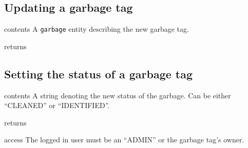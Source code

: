 \subsection{Updating a garbage tag}

\begin{apidata}{contents}
  A \texttt{garbage} entity describing the new garbage tag.
\end{apidata}
\begin{apidata}{returns}
  \begin{datalist}
  \end{datalist}
\end{apidata}


% 
% 


\subsection{Setting the status of a garbage tag}

\begin{apidata}{contents}
  A string denoting the new status of the garbage. Can be either ``CLEANED'' or
  ``IDENTIFIED''.
\end{apidata}
\begin{apidata}{returns}
  \begin{datalist}
  \end{datalist}
\end{apidata}
\begin{apidata}{access}
The logged in user must be an ``ADMIN'' or the garbage tag's owner.
\end{apidata}


